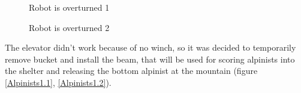 \begin{figure}[H]
	\begin{minipage}[h]{0.47\linewidth}
		\caption{Robot is overturned 1}
		\label{Overturn1.1}
	\end{minipage}
	\hfill
	\begin{minipage}[h]{0.47\linewidth}
		\caption{Robot is overturned 2}
		\label{Overturn1.2}
	\end{minipage}
\end{figure}

The elevator didn't work because of no winch, so it was decided to temporarily remove bucket and install the beam, that will be used for scoring alpinists into the shelter and releasing the bottom alpinist at the mountain (figure \ref{Alpinists1.1}, \ref{Alpinists1.2}).

